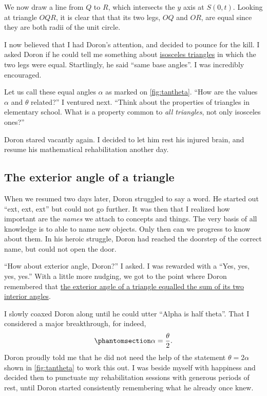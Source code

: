 \documentclass[
  a4paper,
]{article}
\begin{document}
We now draw a line from \(Q\) to \(R\), which intersects the \(y\) axis
at \(S(0, t)\). Looking at triangle \(OQR\), it is clear that that its
two legs, \(OQ\) and \(OR\), are equal since they are both radii of the
unit circle.

I now believed that I had Doron's attention, and decided to pounce for
the kill. I asked Doron if he could tell me something about
\href{https://en.wikipedia.org/wiki/Isosceles_triangle}{isosceles
triangles} in which the two legs were equal. Startlingly, he said ``same
base angles''. I was incredibly encouraged.

Let us call these equal angles \(\alpha\) as marked on
\cref{fig:tantheta}. ``How are the values \(\alpha\) and \(\theta\)
related?'' I ventured next. ``Think about the properties of triangles in
elementary school. What is a property common to \emph{all triangles},
not only isosceles ones?''

Doron stared vacantly again. I decided to let him rest his injured
brain, and resume his mathematical rehabilitation another day.

\subsection{The exterior angle of a
triangle}\label{the-exterior-angle-of-a-triangle}

When we resumed two days later, Doron struggled to say a word. He
started out ``ext, ext, ext'' but could not go further. It was then that
I realized how important are the \emph{names} we attach to concepts and
things. The very basis of all knowledge is to able to name new objects.
Only then can we progress to know about them. In his heroic struggle,
Doron had reached the doorstep of the correct name, but could not open
the door.

``How about exterior angle, Doron?'' I asked. I was rewarded with a
``Yes, yes, yes, yes.'' With a little more nudging, we got to the point
where Doron remembered that
\href{https://www.storyofmathematics.com/exterior-angle-theorem/}{the
exterior angle of a triangle equalled the sum of its two interior
angles}.

I slowly coaxed Doron along until he could utter ``Alpha is half
theta''. That I considered a major breakthrough, for indeed,
\begin{equation}\phantomsection\label{eq:alpha}{
\alpha = \frac{\theta}{2}.
}\end{equation} Doron proudly told me that he did not need the help of
the statement \(\theta = 2\alpha\) shown in \cref{fig:tantheta} to work
this out. I was beside myself with happiness and decided then to
punctuate my rehabilitation sessions with generous periods of rest,
until Doron started consistently remembering what he already once knew.
\end{document}
